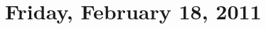 \documentclass [letterpaper,11pt,twoside] {article}
\begin{document}
\setcounter {section}{6}\section {Friday, February 18, 2011}
\end{document}
